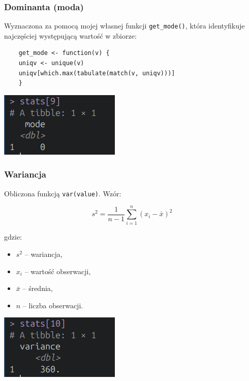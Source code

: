 \documentclass[polish]{article}
\begin{document}
    \newpage

    \subsubsection{Dominanta (moda)}

    Wyznaczona za pomocą mojej własnej funkcji \texttt{get\_mode()}, która identyfikuje najczęściej występującą wartość w zbiorze:

    \begin{verbatim}
    get_mode <- function(v) {
    uniqv <- unique(v)
    uniqv[which.max(tabulate(match(v, uniqv)))]
    }
    \end{verbatim}

    \begin{center}
        \includegraphics{img/mode.png}
    \end{center}

    \subsubsection{Wariancja}

    Obliczona funkcją \texttt{var(value)}. Wzór:

    \Large
    \[
    s^2 = \frac{1}{n - 1} \sum_{i=1}^{n}(x_i - \bar{x})^2
    \]
    \normalsize

    \noindent gdzie:
    \begin{itemize}
    \item \( s^2 \) -- wariancja,
    \item \( x_i \) -- wartość obserwacji,
    \item \( \bar{x} \) -- średnia,
    \item \( n \) -- liczba obserwacji.
    \end{itemize}

    \begin{center}
        \includegraphics{img/variance.png}
    \end{center}
\end{document}
